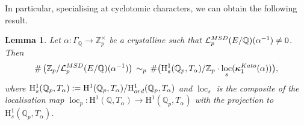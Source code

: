\documentclass[10pt,reqno]{amsart}
\numberwithin{equation}{section}
\theoremstyle{plain}
\theoremstyle{definition}
\newtheorem{rmk}[thm]{Remark}
\theoremstyle{definition}
\theoremstyle{plain}
\theoremstyle{plain}
\newtheorem{lemma}[thm]{Lemma}
\theoremstyle{plain}
\theoremstyle{plain}
\theoremstyle{plain}
\theoremstyle{plain}
\DeclareMathOperator{\ord}{ord}
\newcommand{\Z}{\mathbb{Z}}
\newcommand{\Q}{\mathbb{Q}}
\newcommand{\bkappa}{\boldsymbol{\kappa}}
\DeclareMathOperator{\loc}{loc}
\newcommand{\Lcal}{\mathcal{L}}
\newcommand{\rH}{\mathrm{H}}
\begin{document}


In particular, specialising at cyclotomic characters, we can obtain the following result. 

\begin{lemma}\label{prop:erlKato}
Let $\alpha:\Gamma_\Q\to\Z_p^{\times}$ be a crystalline such that $\Lcal_p^{\rm MSD}(E/\Q)(\alpha^{-1})\neq 0$. %
Then
\[
\# \left(\Z_p/\Lcal^{\rm MSD}_p(E/\Q)(\alpha^{-1}) \right)\,\sim_p\,  \# \bigl(\rH^1_{s}(\Q_p,T_{\alpha})/\Z_p\cdot\loc_s(\bkappa^{\rm Kato}_{1}({\alpha}))\bigr),
\]
where $\rH^1_{s}(\Q_p,T_{\alpha}):=\rH^1(\Q_p,T_{\alpha})/\rH^1_{\rm ord}(\Q_p,T_{\alpha})$ and $\loc_s$ is the composite of the localisation map $\loc_p:\rH^1(\Q,T_{\alpha})\to \rH^1(\Q_p,T_{\alpha})$ with the projection to $\rH^1_{s}(\Q_p,T_{\alpha})$.
\end{lemma}
\end{document}
